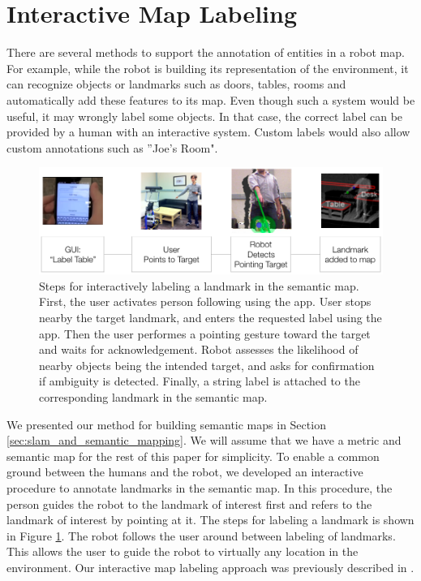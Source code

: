 \documentclass{tADR2e}
\begin{document}
\section{Interactive Map Labeling}
\label{sec:interactive_map_labeling}

There are several methods to support the annotation of entities in a robot map. For example, while the robot is building its representation of the environment, it can recognize objects or landmarks such as doors, tables, rooms and automatically add these features to its map. Even though such a system would be useful, it may wrongly label some objects. In that case, the correct label can be provided by a human with an interactive system. Custom labels would also allow custom annotations such as ''Joe's Room".


\begin{figure}[ht!]
\begin{center}
\centering
\includegraphics[width=\textwidth]{pics/labeling_flow}
\caption{Steps for interactively labeling a landmark in the semantic map. First, the user activates person following using the app. User 
stops nearby the target landmark, and enters the requested label using the app. Then the user performes a pointing gesture toward the target and waits for acknowledgement. Robot assesses the likelihood of nearby objects being the intended target, and asks for confirmation if ambiguity is detected. Finally, a string label is attached to the corresponding landmark in the semantic map.} 
\label{fig:labeling_flow}
\end{center}
\end{figure}


We presented our method for building semantic maps in Section \ref{sec:slam_and_semantic_mapping}. We will assume that we have a metric and semantic map for the rest of this paper for simplicity. To enable a common ground between the humans and the robot, we developed an interactive procedure to annotate landmarks in the semantic map. In this procedure, the person guides the robot to the landmark of interest first and refers to the landmark of interest by pointing at it. The steps for labeling a landmark is shown in Figure \ref{fig:labeling_flow}. The robot follows the user around between labeling of landmarks. This allows the user to guide the robot to virtually any location in the environment. Our interactive map labeling approach was previously described in \cite{trevor2012interactive}.
\end{document}
